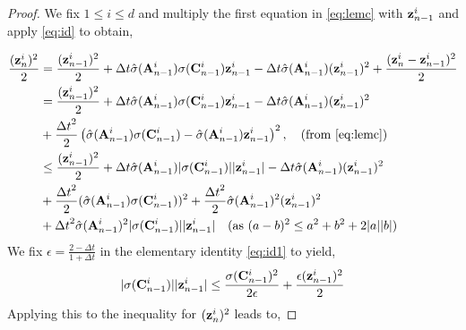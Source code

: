\documentclass{article} \usepackage{iclr2022_conference,times}
\newcommand{\bz}{{\bf z}}
\newcommand{\bA}{{\bf A}}
\newcommand{\bC}{{\bf C}}
\newcommand{\Dt}{{\Delta t}}
\begin{document}
\begin{proof}
We fix $1 \leq i \leq d$ and multiply the first equation in \eqref{eq:lemc} with $\bz^i_{n-1}$ and apply \eqref{eq:id} to obtain,

    \begin{align*}
    \frac{(\bz^i_n)^2}{2} &= \frac{(\bz^i_{n-1})^2}{2} +\Dt \hat{\sigma}(\bA^i_{n-1}) \sigma(\bC^i_{n-1}) \bz^i_{n-1} - \Dt \hat{\sigma}(\bA^i_{n-1}) (\bz^i_{n-1})^2 + \frac{(\bz^i_n-\bz^i_{n-1})^2}{2} \\
    &= \frac{(\bz^i_{n-1})^2}{2} +\Dt \hat{\sigma}(\bA^i_{n-1}) \sigma(\bC^i_{n-1}) \bz^i_{n-1} - \Dt \hat{\sigma}(\bA^i_{n-1}) (\bz^i_{n-1})^2 \\
    &+ \frac{\Dt^2}{2}\left(\hat{\sigma}(\bA^i_{n-1}) \sigma(\bC^i_{n-1})-\hat{\sigma}(\bA^i_{n-1})\bz_{n-1}^i\right)^2, \quad ({\rm from~\eqref{eq:lemc}})\\
    &\leq \frac{(\bz^i_{n-1})^2}{2} +\Dt \hat{\sigma}(\bA^i_{n-1}) |\sigma(\bC^i_{n-1})| |\bz^i_{n-1}| - \Dt \hat{\sigma}(\bA^i_{n-1}) (\bz^i_{n-1})^2 \\
    &+ \frac{\Dt^2}{2} (\hat{\sigma}(\bA^i_{n-1}) \sigma(\bC^i_{n-1}))^2 + \frac{\Dt^2}{2} \hat{\sigma}(\bA^i_{n-1})^2 (\bz^i_{n-1})^2 \\
    &+ \Dt^2\hat{\sigma}(\bA^i_{n-1})^2|\sigma(\bC^i_{n-1})||\bz^i_{n-1}|\quad ({\rm as}~(a-b)^2 \leq a^2+b^2+2|a||b|)
    \end{align*}
We fix $\epsilon = \frac{2-\Dt}{1+\Dt}$ in the elementary identity \eqref{eq:id1} to yield, 
\begin{align*}
|\sigma(\bC^i_{n-1})||\bz^i_{n-1}| \leq \frac{\sigma(\bC^i_{n-1})^2}{2 \epsilon} + \frac{\epsilon(\bz^i_{n-1})^2}{2}
\end{align*}
Applying this to the inequality for $(\bz^i_n)^2$ leads to,    
    

\end{proof}
\end{document}
